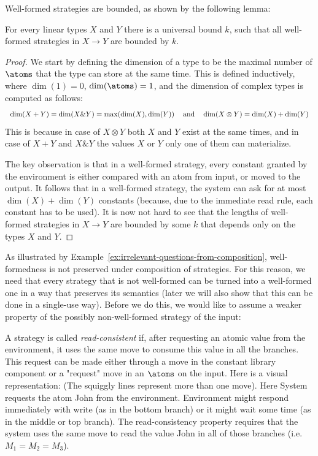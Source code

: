 \noindent
Well-formed strategies are bounded, as shown by the following lemma:
\begin{lemma}\label{lem:well-formed-bounded}
    For every linear types $X$ and $Y$ there is a universal bound $k$, such that all well-formed strategies in $X \to Y$ are bounded by $k$. 
\end{lemma}
\begin{proof}
    We start by defining the dimension of a type to be the maximal number of $\atoms$ that the type can store at the same time. This is defined inductively, 
    where $\dim(1) = 0$, $\dim(\atoms) = 1$, and the dimension of complex types is computed as follows:
    \[ \begin{tabular}{ccc}
        $\dim(X + Y) = \dim(X \& Y) = \max(\dim(X), \dim(Y))$ & and & $\dim(X \otimes Y) = \dim(X) + \dim(Y)$
    \end{tabular}
    \]
    This is because in case of $X \otimes Y$ both $X$ and $Y$ exist at the same times, and in case of $X + Y$ and $X \& Y$ the values $X$ or $Y$
    only one of them can materialize. 

    The key observation is that in a well-formed strategy, every constant granted by the environment is either compared with an atom from input, 
    or moved to the output. It follows that in a well-formed strategy, the system can ask for at most $\dim(X) + \dim(Y)$ constants
    (because, due to the immediate read rule, each constant has to be used). It is now not hard to see that the lengths of well-formed strategies 
    in $X \to Y$ are bounded by some $k$ that depends only on the types $X$ and $Y$.
\end{proof}

As illustrated by Example~\ref{ex:irrelevant-questions-from-composition}, well-formedness is not preserved under composition of strategies. 
For this reason, we need that every  strategy that is not well-formed  can be turned into a well-formed one in a way that preserves its semantics (later we will also 
show that this can be done in a single-use way). Before we do this, we would like to assume a weaker property of the possibly non-well-formed strategy 
of the input:
\begin{definition}
    A strategy is called \emph{read-consistent} if, after requesting an atomic value from the environment, it uses the same move 
    to consume this value in all the branches. This request can be made either through a move in the constant
    library component or a "request" move in an $\atoms$ on the input. Here is a visual representation:
    (The squiggly lines represent more than one move). Here System requests the atom John from the environment. 
    Environment might respond immediately with write (as in the bottom branch) or it might wait some time 
    (as in the middle or top branch). The read-consistency property requires that the system uses the same move to read 
    the value John in all of those branches (i.e. $M_1 = M_2 = M_3$). 
\end{definition}

